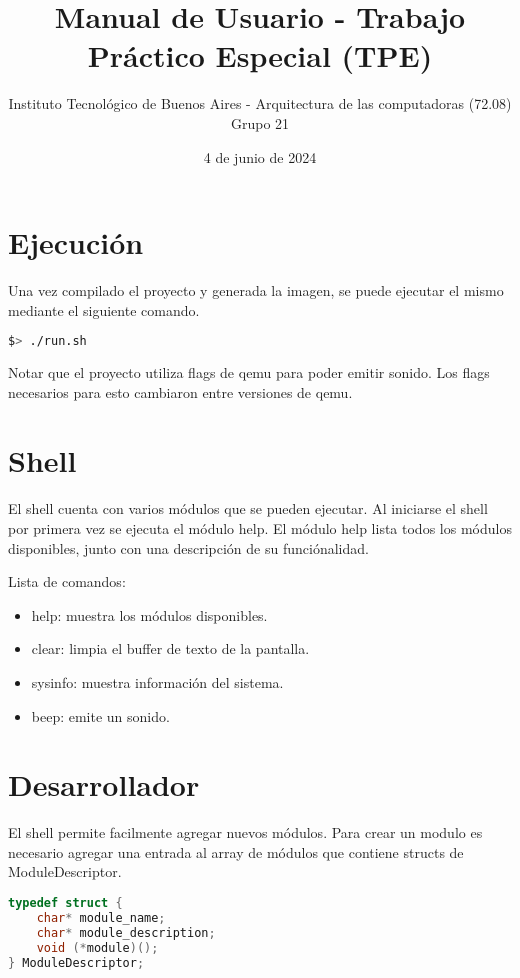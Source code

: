 \documentclass{article}
\title{\textbf{Manual de Usuario - Trabajo Práctico Especial (TPE)}}
\author{ \large Instituto Tecnológico de Buenos Aires - Arquitectura de las computadoras (72.08) \\ [1ex]
\large Grupo 21}
\date{4 de junio de 2024}
\begin{document}
\maketitle

\section *{Ejecución}

Una vez compilado el proyecto y generada la imagen, se puede ejecutar el mismo mediante el siguiente comando.

\begin{lstlisting}[language=bash]
$> ./run.sh
\end{lstlisting}

Notar que el proyecto utiliza flags de qemu para poder emitir sonido. Los flags necesarios para esto cambiaron entre versiones de qemu.

\section *{Shell}

El shell cuenta con varios módulos que se pueden ejecutar. Al iniciarse el shell por primera vez se ejecuta el módulo help. El módulo help lista todos los módulos disponibles, junto con una descripción de su funciónalidad.

Lista de comandos:
\begin{itemize}
\item help: muestra los módulos disponibles.
\item clear: limpia el buffer de texto de la pantalla.
\item sysinfo: muestra información del sistema.
\item beep: emite un sonido.
\end{itemize}

\section *{Desarrollador}

El shell permite facilmente agregar nuevos módulos. Para crear un modulo es necesario agregar una entrada al array de módulos que contiene structs de ModuleDescriptor.

\begin{lstlisting}[language=C]
typedef struct {
    char* module_name;
    char* module_description;
    void (*module)();
} ModuleDescriptor;
\end{lstlisting}
\end{document}
